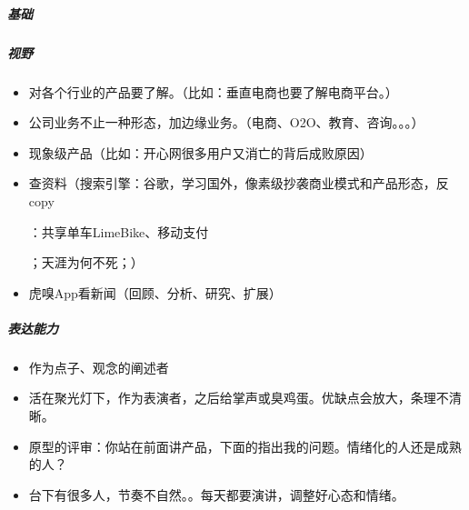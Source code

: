 \documentclass[letterpaper,11pt,english]{sphinxmanual}
\begin{document}
\subparagraph{基础}
\label{\detokenize{chapter_introduction/PM:id46}}

\subparagraph{视野}
\label{\detokenize{chapter_introduction/PM:id47}}\begin{itemize}
\item {} 
对各个行业的产品要了解。（比如：垂直电商也要了解电商平台。）

\item {} 
公司业务不止一种形态，加边缘业务。（电商、O2O、教育、咨询。。。）

\item {} 
现象级产品（比如：开心网很多用户又消亡的背后成败原因）

\item {} 
查资料（搜索引擎：谷歌，学习国外，像素级抄袭商业模式和产品形态，反copy%
\begin{footnote}[158]\sphinxAtStartFootnote
{}
%
\end{footnote}：共享单车LimeBike、移动支付%
\begin{footnote}[159]\sphinxAtStartFootnote
{}
%
\end{footnote}；天涯为何不死；）

\item {} 
虎嗅App看新闻（回顾、分析、研究、扩展）

\end{itemize}


\subparagraph{表达能力}
\label{\detokenize{chapter_introduction/PM:id48}}\begin{itemize}
\item {} 
作为点子、观念的阐述者

\item {} 
活在聚光灯下，作为表演者，之后给掌声或臭鸡蛋。优缺点会放大，条理不清晰。

\item {} 
原型的评审：你站在前面讲产品，下面的指出我的问题。情绪化的人还是成熟的人？

\item {} 
台下有很多人，节奏不自然。。每天都要演讲，调整好心态和情绪。

\end{itemize}
\end{document}
